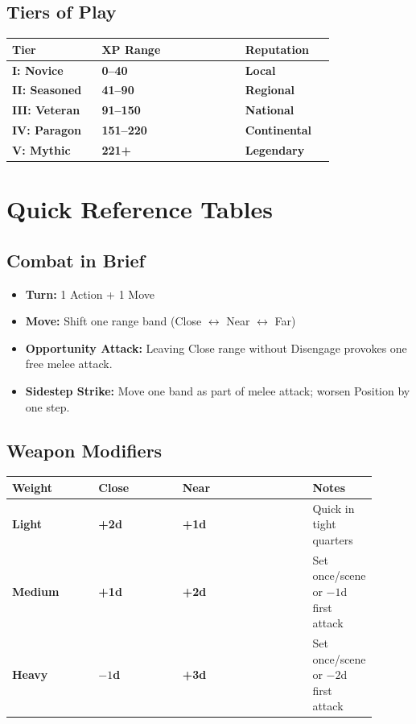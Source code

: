 \documentclass[10pt]{article}
\begin{document}
\subsection{Tiers of Play}
\begin{coretable}
\begin{tabular}{>{\bfseries}p{0.25\linewidth} >{\bfseries}p{0.4\linewidth} >{\bfseries}p{0.25\linewidth}}
\toprule
\textbf{Tier} & \textbf{XP Range} & \textbf{Reputation} \\
\midrule
I: Novice & 0–40 & Local \\
II: Seasoned & 41–90 & Regional \\
III: Veteran & 91–150 & National \\
IV: Paragon & 151–220 & Continental \\
V: Mythic & 221+ & Legendary \\
\bottomrule
\end{tabular}
\end{coretable}

\section{Quick Reference Tables}

\subsection{Combat in Brief}
\begin{itemize}[leftmargin=*]
    \item \textbf{Turn:} 1 Action + 1 Move
    \item \textbf{Move:} Shift one range band (Close $\leftrightarrow$ Near $\leftrightarrow$ Far)
    \item \textbf{Opportunity Attack:} Leaving Close range without Disengage provokes one free melee attack.
    \item \textbf{Sidestep Strike:} Move one band as part of melee attack; worsen Position by one step.
\end{itemize}

\subsection{Weapon Modifiers}
\begin{coretable}
\begin{tabular}{>{\bfseries}p{0.25\linewidth} >{\bfseries}p{0.25\linewidth} >{\bfseries}p{0.4\linewidth}}
\toprule
\textbf{Weight} & \textbf{Close} & \textbf{Near} & \textbf{Notes} \\
\midrule
Light & +2d & +1d & Quick in tight quarters \\
Medium & +1d & +2d & Set once/scene or $-1$d first attack \\
Heavy & $-1$d & +3d & Set once/scene or $-2$d first attack \\
\bottomrule
\end{tabular}
\end{coretable}
\end{document}
